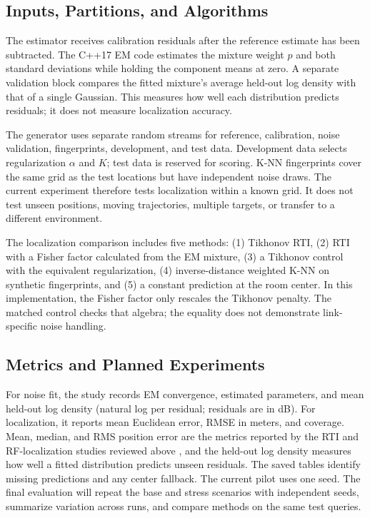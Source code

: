 \documentclass[sensors,article,submit,oneauthor]{Definitions/mdpi}
\begin{document}
\subsection{Inputs, Partitions, and Algorithms}

The estimator receives calibration residuals after the reference estimate has been subtracted. The C++17 EM code estimates the mixture weight $p$ and both standard deviations while holding the component means at zero. A separate validation block compares the fitted mixture's average held-out log density with that of a single Gaussian. This measures how well each distribution predicts residuals; it does not measure localization accuracy.

The generator uses separate random streams for reference, calibration, noise validation, fingerprints, development, and test data. Development data selects regularization $\alpha$ and $K$; test data is reserved for scoring. K-NN fingerprints cover the same grid as the test locations but have independent noise draws. The current experiment therefore tests localization within a known grid. It does not test unseen positions, moving trajectories, multiple targets, or transfer to a different environment.

The localization comparison includes five methods: (1) Tikhonov RTI, (2) RTI with a Fisher factor calculated from the EM mixture, (3) a Tikhonov control with the equivalent regularization, (4) inverse-distance weighted K-NN on synthetic fingerprints, and (5) a constant prediction at the room center. In this implementation, the Fisher factor only rescales the Tikhonov penalty. The matched control checks that algebra; the equality does not demonstrate link-specific noise handling.

\subsection{Metrics and Planned Experiments}

For noise fit, the study records EM convergence, estimated parameters, and mean held-out log density (natural log per residual; residuals are in dB). For localization, it reports mean Euclidean error, RMSE in meters, and coverage. Mean, median, and RMS position error are the metrics reported by the RTI and RF-localization studies reviewed above \cite{Huang2020,Zhao2011,Kaltiokallio2021,Bahl2000}, and the held-out log density measures how well a fitted distribution predicts unseen residuals. The saved tables identify missing predictions and any center fallback. The current pilot uses one seed. The final evaluation will repeat the base and stress scenarios with independent seeds, summarize variation across runs, and compare methods on the same test queries.
\end{document}
